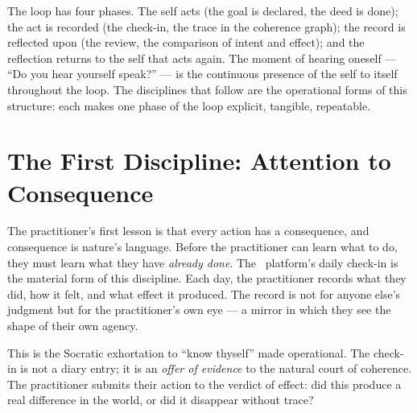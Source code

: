 \begin{center}
\end{center}

The loop has four phases. The self acts (the goal is declared, the deed is
done); the act is recorded (the check-in, the trace in the coherence graph);
the record is reflected upon (the review, the comparison of intent and effect);
and the reflection returns to the self that acts again. The moment of hearing
oneself --- ``Do you hear yourself speak?'' --- is the continuous presence of
the self to itself throughout the loop. The disciplines that follow are the
operational forms of this structure: each makes one phase of the loop explicit,
tangible, repeatable.

\section{The First Discipline: Attention to Consequence}

The practitioner's first lesson is that every action has a consequence, and
consequence is nature's language. Before the practitioner can learn what to do,
they must learn what they have \emph{already done}. The \praxis\ platform's
daily check-in is the material form of this discipline. Each day, the practitioner
records what they did, how it felt, and what effect it produced. The record is
not for anyone else's judgment but for the practitioner's own eye --- a mirror
in which they see the shape of their own agency.

This is the Socratic exhortation to ``know thyself'' made operational. The
check-in is not a diary entry; it is an \emph{offer of evidence} to the natural
court of coherence. The practitioner submits their action to the verdict of
effect: did this produce a real difference in the world, or did it disappear
without trace?

